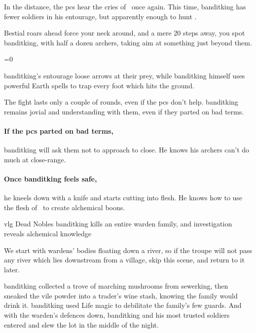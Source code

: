 In the distance, the \glspl{pc} hear the cries of \localMonster\ once again.
This time, \gls{banditking} has fewer soldiers in his entourage, but apparently enough to hunt \localMonster.

\begin{boxtext}
  Bestial roars ahead force your neck around, and a mere 20 \glspl{step} away, you spot \gls{banditking}, with half a dozen archers, taking aim at something just beyond them.
\end{boxtext}

\ifnum\value{temperature}=0
  \griffin
\else
  \basilisk
\fi

\Gls{banditking}'s entourage loose arrows at their prey, while \gls{banditking} himself uses powerful Earth spells to trap every foot which hits the ground.

The fight lasts only a couple of rounds, even if the \glspl{pc} don't help.
\Gls{banditking} remains jovial and understanding with them, even if they parted on bad terms.

\paragraph{If the \glspl{pc} parted on bad terms,}
\gls{banditking} will ask them not to approach to close.
He knows his archers can't do much at close-range.

\paragraph{Once \gls{banditking} feels safe,}
he kneels down with a knife and starts cutting into flesh.
He knows how to use the flesh of \localMonster\ to create alchemical \glspl{boon}.%

{\gls{vlg} Dead Nobles}%
{\Gls{banditking} kills an entire \gls{warden} family, and investigation reveals alchemical knowledge}%

We start with \glspl{warden}' bodies floating down a river, so if the troupe will not pass any river which lies downstream from a \gls{village}, skip this scene, and return to it later.

\begin{exampletext}
  \Gls{banditking} collected a trove of marching mushrooms from \gls{sewerking}, then sneaked the vile powder into a trader's wine stash, knowing the family would drink it.
  \Gls{banditking} used Life magic to debilitate the family's few guards.
  And with the \gls{warden}'s defences down, \gls{banditking} and his most trusted soldiers entered and slew the lot in the middle of the night.
\end{exampletext}

